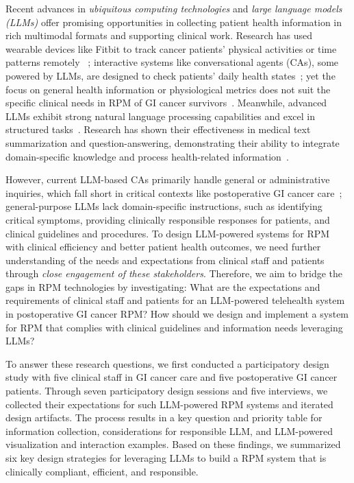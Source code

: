 Recent advances in \textit{ubiquitous computing technologies} and \textit{large language models (LLMs)} offer promising opportunities in collecting patient health information in rich multimodal formats and supporting clinical work.
Research has used wearable devices like Fitbit to track cancer patients' physical activities or time patterns remotely ~\cite{FitbitWeartimePatterns, dreherFitbitUsagePatients2019, ghods2021remote}; interactive systems like conversational agents (CAs), some powered by LLMs, are designed to check patients' daily health states~\cite{yang2023talk2care,jo_understanding_2023, omarovArtificialIntelligenceEnabled2022, dwyer2023use, li2024beyond, hao2024advancing}; yet
the focus on general health information or physiological metrics does not suit the specific clinical needs in RPM of GI cancer survivors~\cite{yamagataCurrentStatusEnhanced2019, sempleUsingMobileApp2015}.
Meanwhile, advanced LLMs exhibit strong natural language processing capabilities and excel in structured tasks~\cite{brownLanguageModelsAre2020, openaiGPT4TechnicalReport2023, touvronLlamaOpenFoundation2023}. Research has shown their effectiveness in medical text summarization and question-answering, demonstrating their ability to integrate domain-specific knowledge and process health-related information~\cite{agrawalLargeLanguageModels2022, liuLargeLanguageModels2023, luContextualEmbeddingModel2022}.

However, current LLM-based CAs primarily handle general or administrative inquiries, which fall short in critical contexts like postoperative GI cancer care~\cite{ni2017mandy,geoghegan2021automated}; general-purpose LLMs lack domain-specific instructions, such as identifying critical symptoms, providing clinically responsible responses for patients, and clinical guidelines and procedures. 
To design LLM-powered systems for RPM with clinical efficiency and better patient health outcomes, we need further understanding of the needs and expectations from clinical staff and patients through \textit{close engagement of these stakeholders}.
Therefore, we aim to bridge the gaps in RPM technologies by investigating: What are the expectations and requirements of clinical staff and patients for an LLM-powered telehealth system in postoperative GI cancer RPM?  How should we design and implement a system for RPM that complies with clinical guidelines and information needs leveraging LLMs?


To answer these research questions, we first conducted a participatory design study with five clinical staff in GI cancer care and five postoperative GI cancer patients. Through seven participatory design sessions and five interviews, we collected their expectations for such LLM-powered RPM systems and iterated design artifacts. The process results in a key question and priority table for information collection, considerations for responsible LLM, and LLM-powered visualization and interaction examples.
Based on these findings, we summarized six key design strategies for leveraging LLMs to build a RPM system that is clinically compliant, efficient, and responsible.

